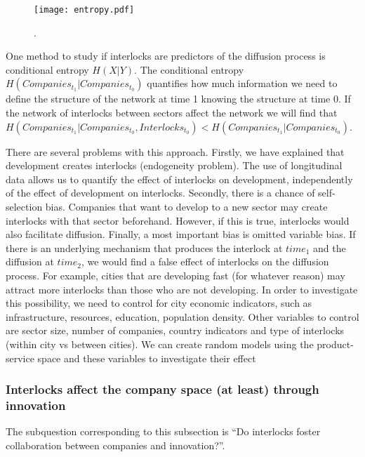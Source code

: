 \begin{figure}
\begin{center}
\texttt{[image: entropy.pdf]}
\caption{.}
\label{fig:entropy}
\end{center}
\end{figure}

One method to study if interlocks are predictors of the diffusion process is conditional entropy $H(X|Y)$.
The conditional entropy  $H(Companies_{t_1}|Companies_{t_0})$ quantifies how much information we need to define the structure of the network at time 1 knowing the structure at time 0. 
If the network of interlocks between sectors affect the network we will find that $H(Companies_{t_1}|Companies_{t_0},Interlocks_{t_0}) < H(Companies_{t_1}|Companies_{t_0})$.


There are several problems with this approach.
Firstly, we have explained that development creates interlocks (endogeneity problem).
The use of longitudinal data allows us to quantify the effect of interlocks on development,
independently of the effect of development on interlocks.
Secondly, there is a chance of self-selection bias.
Companies that want to develop to a new sector may create interlocks with that sector beforehand.
However, if this is true, interlocks would also facilitate diffusion.
Finally, a most important bias is omitted variable bias.
If there is an underlying mechanism that produces the interlock at $time_1$ and the diffusion at $time_2$, 
we would find a false effect of interlocks on the diffusion process.
For example, cities that are developing fast (for whatever reason) may attract more interlocks than those who are not developing.
In order to investigate this possibility, we need to control for city economic indicators, such as infrastructure, resources, education, population density.
Other variables to control are sector size, number of companies, country indicators and type of interlocks (within city vs between cities).
We can create random models using the product-service space and these variables to investigate their effect

\subsubsection{Interlocks affect the company space (at least) through innovation}
The subquestion corresponding to this subsection is ``Do interlocks foster collaboration between companies and innovation?''.



